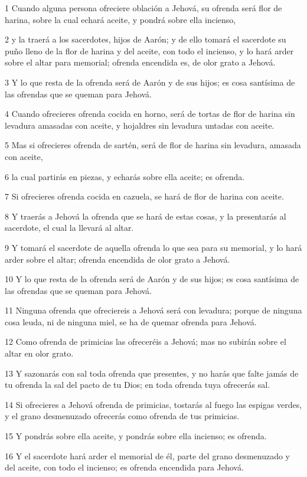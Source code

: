 \par 1 Cuando alguna persona ofreciere oblación a Jehová, su ofrenda será flor de harina, sobre la cual echará aceite, y pondrá sobre ella incienso,
\par 2 y la traerá a los sacerdotes, hijos de Aarón; y de ello tomará el sacerdote su puño lleno de la flor de harina y del aceite, con todo el incienso, y lo hará arder sobre el altar para memorial; ofrenda encendida es, de olor grato a Jehová.
\par 3 Y lo que resta de la ofrenda será de Aarón y de sus hijos; es cosa santísima de las ofrendas que se queman para Jehová.
\par 4 Cuando ofrecieres ofrenda cocida en horno, será de tortas de flor de harina sin levadura amasadas con aceite, y hojaldres sin levadura untadas con aceite.
\par 5 Mas si ofrecieres ofrenda de sartén, será de flor de harina sin levadura, amasada con aceite,
\par 6 la cual partirás en piezas, y echarás sobre ella aceite; es ofrenda.
\par 7 Si ofrecieres ofrenda cocida en cazuela, se hará de flor de harina con aceite.
\par 8 Y traerás a Jehová la ofrenda que se hará de estas cosas, y la presentarás al sacerdote, el cual la llevará al altar.
\par 9 Y tomará el sacerdote de aquella ofrenda lo que sea para su memorial, y lo hará arder sobre el altar; ofrenda encendida de olor grato a Jehová.
\par 10 Y lo que resta de la ofrenda será de Aarón y de sus hijos; es cosa santísima de las ofrendas que se queman para Jehová.
\par 11 Ninguna ofrenda que ofreciereis a Jehová será con levadura; porque de ninguna cosa leuda, ni de ninguna miel, se ha de quemar ofrenda para Jehová.
\par 12 Como ofrenda de primicias las ofreceréis a Jehová; mas no subirán sobre el altar en olor grato.
\par 13 Y sazonarás con sal toda ofrenda que presentes, y no harás que falte jamás de tu ofrenda la sal del pacto de tu Dios; en toda ofrenda tuya ofrecerás sal.
\par 14 Si ofrecieres a Jehová ofrenda de primicias, tostarás al fuego las espigas verdes, y el grano desmenuzado ofrecerás como ofrenda de tus primicias.
\par 15 Y pondrás sobre ella aceite, y pondrás sobre ella incienso; es ofrenda.
\par 16 Y el sacerdote hará arder el memorial de él, parte del grano desmenuzado y del aceite, con todo el incienso; es ofrenda encendida para Jehová.

